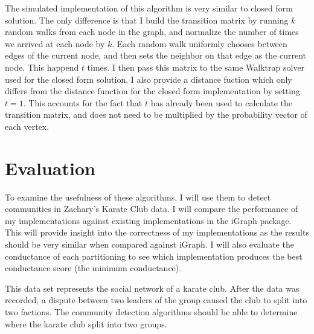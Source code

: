 \documentclass{article}
\begin{document}
    The simulated implementation of this algorithm is very similar to closed form solution. The only difference is that I build the transition matrix by running $k$ random walks from each node in the graph, and normalize the number of times we arrived at each node by $k$. Each random walk uniformly chooses between edges of the current node, and then sets the neighbor on that edge as the current node. This happend $t$ times. I then pass this matrix to the same Walktrap solver used for the closed form solution. I also provide a distance fuction which only differs from the distance function for the closed form implementation by setting $t = 1$. This accounts for the fact that $t$ has already been used to calculate the transition matrix, and does not need to be multiplied by the probability vector of each vertex.

\section{Evaluation}
To examine the usefulness of these algorithms, I will use them to detect communities in Zachary's Karate Club data. I will compare the performance of my implementations against existing implementations in the iGraph package. This will provide insight into the correctness of my implementations as the results should be very similar when compared against iGraph. I will also evaluate the conductance of each partitioning to see which implementation produces the best conductance score (the minimum conductance).
\par
This data set represents the social network of a karate club. After the data was recorded, a dispute between two leaders of the group caused the club to split into two factions. The community detection algorithms should be able to determine where the karate club split into two groups.
\end{document}
